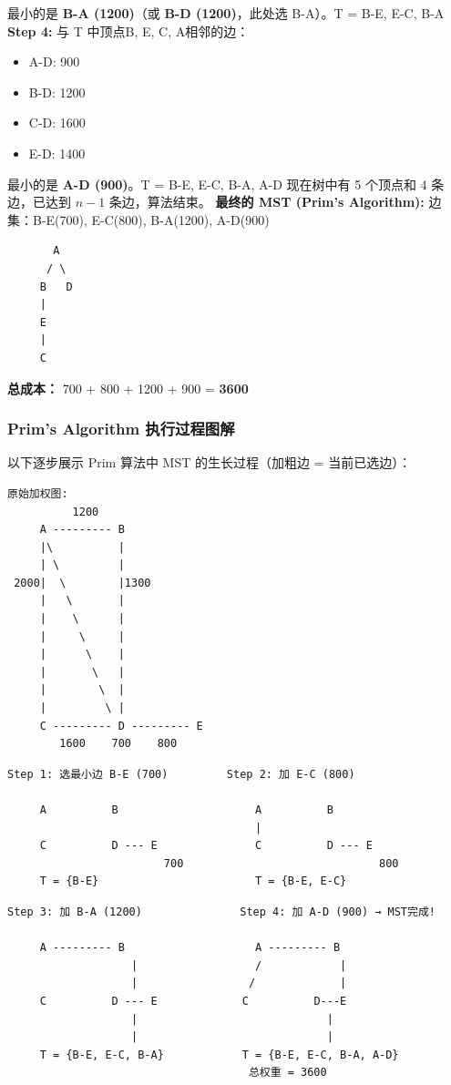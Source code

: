 \documentclass[10pt,a4paper,openany]{ctexbook}
\theoremstyle{definition}
\theoremstyle{remark}
\begin{document}
最小的是 \textbf{B-A (1200)}（或 \textbf{B-D (1200)}，此处选 B-A）。T = {B-E, E-C, B-A}
\textbf{Step 4:} 与 T 中顶点{B, E, C, A}相邻的边：
\begin{itemize}
\item A-D: 900
\item B-D: 1200
\item C-D: 1600
\item E-D: 1400

\end{itemize}

最小的是 \textbf{A-D (900)}。T = {B-E, E-C, B-A, A-D}
现在树中有 5 个顶点和 4 条边，已达到 $n-1$ 条边，算法结束。
\textbf{最终的 MST (Prim's Algorithm):}
边集：{B-E(700), E-C(800), B-A(1200), A-D(900)}
{\footnotesize\begin{verbatim}
       A
      / \
     B   D
     |
     E
     |
     C
\end{verbatim}}

\textbf{总成本：} 700 + 800 + 1200 + 900 = \textbf{3600}
\subsubsection{Prim's Algorithm 执行过程图解}

以下逐步展示 Prim 算法中 MST 的生长过程（加粗边 = 当前已选边）：
{\footnotesize\begin{verbatim}
原始加权图:                   
          1200
     A --------- B
     |\          |
     | \         |
 2000|  \        |1300
     |   \       |
     |    \      |
     |     \     |
     |      \    |
     |       \   |
     |        \  |
     |         \ |
     C --------- D --------- E
        1600    700    800
\end{verbatim}}

{\footnotesize\begin{verbatim}
Step 1: 选最小边 B-E (700)         Step 2: 加 E-C (800)

     A          B                     A          B
                                      |
     C          D --- E               C          D --- E
                        700                              800
     T = {B-E}                        T = {B-E, E-C}
\end{verbatim}}

{\footnotesize\begin{verbatim}
Step 3: 加 B-A (1200)               Step 4: 加 A-D (900) → MST完成!

     A --------- B                    A --------- B
                   |                  /            |
                   |                 /             |
     C          D --- E             C          D---E
                   |                             |
                   |                             |
     T = {B-E, E-C, B-A}            T = {B-E, E-C, B-A, A-D}
                                     总权重 = 3600
\end{verbatim}}
\end{document}
